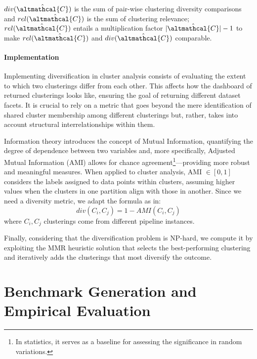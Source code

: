 \noindent $div(\hat{\altmathcal{C}})$ is the sum of pair-wise clustering diversity comparisons and $rel(\hat{\altmathcal{C}})$ is the sum of clustering relevance;
$rel(\hat{\altmathcal{C}})$ entails a multiplication factor $|\hat{\altmathcal{C}}|-1$ to make $rel(\hat{\altmathcal{C}})$ and $div(\hat{\altmathcal{C}})$ comparable.


\paragraph{Implementation}
Implementing diversification in cluster analysis consists of evaluating the extent to which two clusterings differ from each other.
This affects how the dashboard of returned clusterings looks like, ensuring the goal of returning different dataset facets.
It is crucial to rely on a metric that goes beyond the mere identification of shared cluster membership among different clusterings but, rather, takes into account structural interrelationships within them.

Information theory introduces the concept of Mutual Information, quantifying the degree of dependence between two variables and, more specifically, Adjusted Mutual Information (AMI) allows for chance agreement\footnote{In statistics, it serves as a baseline for assessing the significance in random variations.}---providing more robust and meaningful measures.
When applied to cluster analysis, AMI $\in [0, 1]$ considers the labels assigned to data points within clusters, assuming higher values when the clusters in one partition align with those in another.
Since we need a diversity metric, we adapt the formula as in:
$$div(C_i, C_j) = 1- AMI(C_i, C_j)$$
where $C_i, C_j$ clusterings come from different pipeline instances.

Finally, considering that the diversification problem is NP-hard, we compute it by exploiting the MMR heuristic solution \cite{vieira2011query} that selects the best-performing clustering and iteratively adds the clusterings that most diversify the outcome.

\section{Benchmark Generation and Empirical Evaluation}\label{clustering-sec:test}


